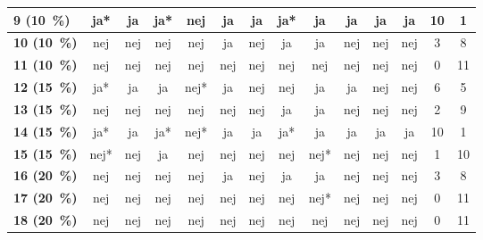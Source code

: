 \begin{longtable} {|l|c|c|c|c|c|c|c|c|c|c|c|c|c|}
\cellcolor[HTML]{C0C0C0}\textbf{9    (10~\%)}	& ja* 	& ja  &	ja*  & \cellcolor[HTML]{D4EED3}nej   & ja  & ja  &ja*   &ja &ja &ja &ja & \cellcolor[HTML]{EFEFEF}10 & \cellcolor[HTML]{EFEFEF}1 \\ \hline
\cellcolor[HTML]{C0C0C0}\textbf{10 (10~\%)}	&nej &nej &nej&	nej	&ja	&nej&	ja&	ja&	nej&	nej&nej & \cellcolor[HTML]{EFEFEF}3 & \cellcolor[HTML]{EFEFEF}8 \\ \hline
\cellcolor[HTML]{C0C0C0}\textbf{11   (10~\%)}	 & \cellcolor[HTML]{ECF4FF} nej	& \cellcolor[HTML]{ECF4FF}nej &	\cellcolor[HTML]{ECF4FF}nej &\cellcolor[HTML]{ECF4FF} nej	& \cellcolor[HTML]{ECF4FF}nej &	\cellcolor[HTML]{ECF4FF}nej	& \cellcolor[HTML]{ECF4FF}nej & \cellcolor[HTML]{ECF4FF}nej	& \cellcolor[HTML]{ECF4FF}nej	& \cellcolor[HTML]{ECF4FF}nej	& \cellcolor[HTML]{ECF4FF}nej & \cellcolor[HTML]{EFEFEF}0 & \cellcolor[HTML]{EFEFEF}11\\ \hline 
\cellcolor[HTML]{C0C0C0}\textbf{12 (15~\%)}	&ja*&	ja&	ja&	nej*&	ja&	nej&	nej&	ja&	ja&	nej&	nej & \cellcolor[HTML]{EFEFEF}6 & \cellcolor[HTML]{EFEFEF}5 \\ \hline
\cellcolor[HTML]{C0C0C0}\textbf{13 (15~\%)}	&nej&	nej&	nej&	nej&	nej&	nej& 	ja&	ja&	nej&	nej&	nej & \cellcolor[HTML]{EFEFEF}2 & \cellcolor[HTML]{EFEFEF}9\\ \hline
\cellcolor[HTML]{C0C0C0}\textbf{14 (15~\%)}&ja*&	ja&	ja*& \cellcolor[HTML]{D4EED3}nej*&	ja&	ja&	ja*&	ja&	ja&	ja&	ja &\cellcolor[HTML]{EFEFEF}10 &\cellcolor[HTML]{EFEFEF}1
\\ \hline
\cellcolor[HTML]{C0C0C0}\textbf{15 (15~\%)}	& nej* & nej & \cellcolor[HTML]{D4EED3}ja & nej & nej & nej &	nej & nej* & nej & nej & nej & \cellcolor[HTML]{EFEFEF}1 & \cellcolor[HTML]{EFEFEF}10 \\ \hline
\cellcolor[HTML]{C0C0C0}\textbf{16 (20~\%)}	& nej & nej & nej & nej & ja & nej & ja & ja & nej & nej & nej & \cellcolor[HTML]{EFEFEF}3 & \cellcolor[HTML]{EFEFEF}8 \\ \hline
\cellcolor[HTML]{C0C0C0}\textbf{17 (20~\%)} & \cellcolor[HTML]{ECF4FF} nej	& \cellcolor[HTML]{ECF4FF}nej &	\cellcolor[HTML]{ECF4FF}nej &\cellcolor[HTML]{ECF4FF} nej	& \cellcolor[HTML]{ECF4FF}nej &	\cellcolor[HTML]{ECF4FF}nej	& \cellcolor[HTML]{ECF4FF}nej & \cellcolor[HTML]{ECF4FF}nej*	& \cellcolor[HTML]{ECF4FF}nej	& \cellcolor[HTML]{ECF4FF}nej	& \cellcolor[HTML]{ECF4FF}nej & \cellcolor[HTML]{EFEFEF}0 & \cellcolor[HTML]{EFEFEF}11\\ \hline 
\cellcolor[HTML]{C0C0C0}\textbf{18 (20~\%)}	 & \cellcolor[HTML]{ECF4FF} nej	& \cellcolor[HTML]{ECF4FF}nej &	\cellcolor[HTML]{ECF4FF}nej &\cellcolor[HTML]{ECF4FF} nej	& \cellcolor[HTML]{ECF4FF}nej &	\cellcolor[HTML]{ECF4FF}nej	& \cellcolor[HTML]{ECF4FF}nej & \cellcolor[HTML]{ECF4FF}nej	& \cellcolor[HTML]{ECF4FF}nej	& \cellcolor[HTML]{ECF4FF}nej	& \cellcolor[HTML]{ECF4FF}nej & \cellcolor[HTML]{EFEFEF}0 & \cellcolor[HTML]{EFEFEF}11\\ \hline 

\end{longtable}
